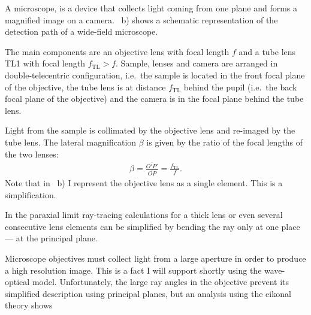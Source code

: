 A microscope, is a device that collects light coming from one plane  
and forms a magnified image on a
camera. ~b) shows a schematic
representation of the detection path of a wide-field microscope.

The main components are an objective lens with focal length $f$ and a
 tube lens TL1 with focal length
$f_\textrm{TL}>f$. Sample, lenses and camera are arranged in
double-telecentric configuration, i.e.\ the sample is located in the
front focal plane of the objective, the tube lens is at distance
$f_\textrm{TL}$ behind the pupil (i.e.\ the back focal plane of the
objective) and the camera is in the focal plane behind the tube lens.




Light from the sample is collimated by the objective lens and
 re-imaged by the tube lens. The lateral
magnification $\beta$ is given by the ratio of the focal lengths of
the two lenses:
\begin{align}
  \beta=\frac{\overline{O'P'}}{\overline{OP}}=\frac{f_\mathrm{TL}}{f}. \label{eq:beta}
\end{align}
Note that in ~b) I represent the
objective lens as a single element.  This is a simplification.

In the paraxial limit ray-tracing calculations for a thick lens or
even several consecutive lens elements can be simplified by bending
the ray only at one place --- at the principal plane.





Microscope objectives must collect light from a large aperture in
 order to produce a high
resolution image. This is a fact I will support shortly using the
wave-optical model. Unfortunately, the large ray angles in the
objective prevent its simplified description using principal planes,
but an analysis using the eikonal theory \citep{Haferkorn1984} shows %


